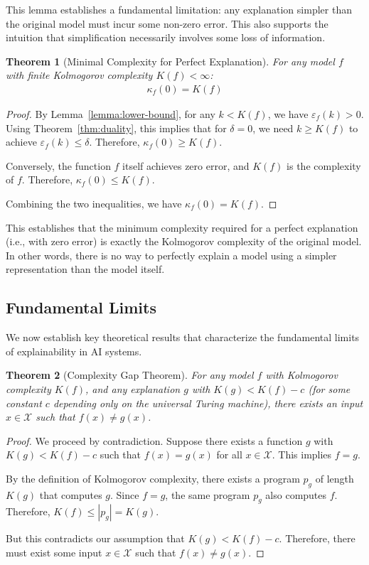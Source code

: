 \documentclass[11pt,letter,leqno]{article}
\newtheorem{theorem}{Theorem}[section]
\begin{document}
This lemma establishes a fundamental limitation: any explanation simpler than the original model must incur some non-zero error. This also supports the intuition that simplification necessarily involves some loss of information.

\begin{theorem}[Minimal Complexity for Perfect Explanation]
\label{thm:minimal-complexity}
For any model $f$ with finite Kolmogorov complexity $K(f) < \infty$:
\begin{align}
\kappa_f(0) = K(f)
\end{align}
\end{theorem}

\begin{proof}
By Lemma~\ref{lemma:lower-bound}, for any $k < K(f)$, we have $\varepsilon_f(k) > 0$. Using Theorem~\ref{thm:duality}, this implies that for $\delta = 0$, we need $k \geq K(f)$ to achieve $\varepsilon_f(k) \leq \delta$.  Therefore, $\kappa_f(0) \geq K(f)$.

Conversely, the function $f$ itself achieves zero error, and $K(f)$ is the complexity of $f$.  Therefore, $\kappa_f(0) \leq K(f)$.

Combining the two inequalities, we have $\kappa_f(0) = K(f)$.
\end{proof}

This establishes that the minimum complexity required for a perfect explanation (i.e., with zero error) is exactly the Kolmogorov complexity of the original model.  In other words, there is no way to perfectly explain a model using a simpler representation than the model itself.

\subsection{Fundamental Limits}
\label{subsec:fundamental-limits}

We now establish key theoretical results that characterize the fundamental limits of explainability in AI systems.

\begin{theorem}[Complexity Gap Theorem]
\label{thm:complexity-gap}
For any model $f$ with Kolmogorov complexity $K(f)$, and any explanation $g$ with $K(g) < K(f) - c$ (for some constant $c$ depending only on the universal Turing machine), there exists an input $x \in \mathcal{X}$ such that $f(x) \neq g(x)$.
\end{theorem}

\begin{proof}
We proceed by contradiction.  Suppose there exists a function $g$ with $K(g) < K(f) - c$ such that $f(x) = g(x)$ for all $x \in \mathcal{X}$.  This implies $f = g$.

By the definition of Kolmogorov complexity, there exists a program $p_g$ of length $K(g)$ that computes $g$.  Since $f = g$, the same program $p_g$ also computes $f$.  Therefore, $K(f) \leq |p_g| = K(g)$.

But this contradicts our assumption that $K(g) < K(f) - c$.  Therefore, there must exist some input $x \in \mathcal{X}$ such that $f(x) \neq g(x)$.
\end{proof}
\end{document}
